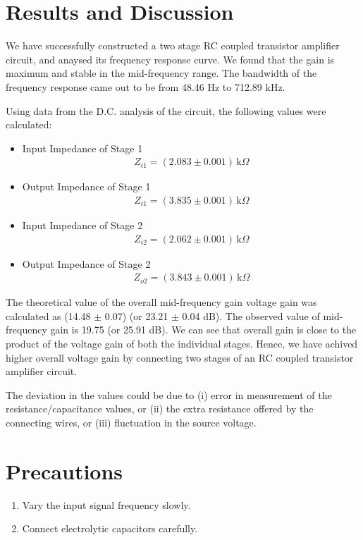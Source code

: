\section{Results and Discussion}
We have successfully constructed a two stage RC coupled transistor amplifier circuit, and anaysed its frequency response curve. We found that the gain is maximum and stable in the mid-frequency range. The bandwidth of the frequency response came out to be from 48.46 Hz to 712.89 kHz.

Using data from the D.C. analysis of the circuit, the following values were calculated:

\begin{itemize}
    \item Input Impedance of Stage 1
        \begin{align*}
            Z_{i1} = (2.083 \pm 0.001)\,\text{k}\Omega
        \end{align*}
    \item Output Impedance of Stage 1
        \begin{align*}
            Z_{i1} = (3.835 \pm 0.001)\,\text{k}\Omega
        \end{align*}
    \item Input Impedance of Stage 2
        \begin{align*}
            Z_{i2} = (2.062 \pm 0.001)\,\text{k}\Omega
        \end{align*}
    \item Output Impedance of Stage 2
        \begin{align*}
            Z_{o2} = (3.843 \pm 0.001)\,\text{k}\Omega
        \end{align*}
\end{itemize}

The theoretical value of the overall mid-frequency gain voltage gain was calculated as (14.48 $\pm$ 0.07) (or 23.21 $\pm$ 0.04 dB). The observed value of mid-frequency gain is 19.75 (or 25.91 dB). We can see that overall gain is close to the product of the voltage gain of both the individual stages. Hence, we have achived higher overall voltage gain by connecting two stages of an RC coupled transistor amplifier circuit.

The deviation in the values could be due to (i) error in measurement of the resistance/capacitance values, or (ii) the extra resistance offered by the connecting wires, or (iii) fluctuation in the source voltage.

\section{Precautions}
\begin{enumerate}
    \item Vary the input signal frequency slowly.
    \item Connect electrolytic capacitors carefully.
\end{enumerate}